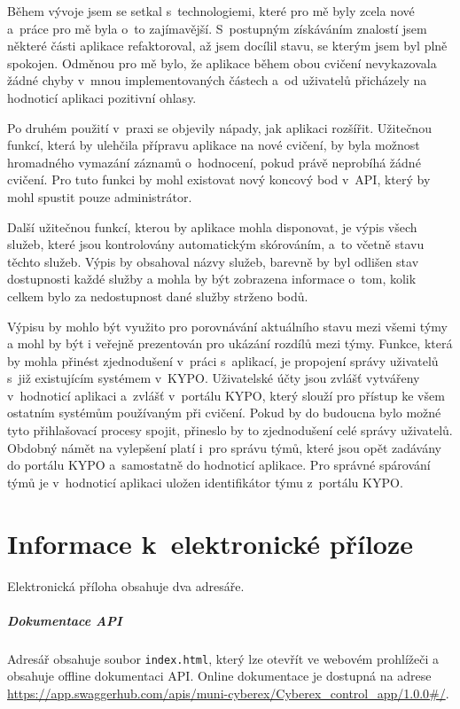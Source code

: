 \documentclass[
  digital,
  twoside,
  table, 
  nolof, 
  nolot
]{fithesis3}
\begin{document}
Během vývoje jsem se setkal s~technologiemi, které pro mě byly zcela nové a~práce pro mě byla o~to zajímavější. S~postupným získáváním znalostí jsem některé části aplikace refaktoroval, až jsem docílil stavu, se kterým jsem byl plně spokojen. Odměnou pro mě bylo, že aplikace během obou cvičení nevykazovala žádné chyby v~mnou implementovaných částech a~od uživatelů přicházely na hodnoticí aplikaci pozitivní ohlasy.

Po druhém použití v~praxi se objevily nápady, jak aplikaci rozšířit. Užitečnou funkcí, která by ulehčila přípravu aplikace na nové cvičení, by byla možnost hromadného vymazání záznamů o~hodnocení, pokud právě neprobíhá žádné cvičení. Pro tuto funkci by mohl existovat nový koncový bod v~API, který by mohl spustit pouze administrátor. 

Další užitečnou funkcí, kterou by aplikace mohla disponovat, je výpis všech služeb, které jsou kontrolovány automatickým skórováním, a~to včetně stavu těchto služeb. Výpis by obsahoval názvy služeb, barevně by byl odlišen stav dostupnosti každé služby a mohla by být zobrazena informace o~tom, kolik celkem bylo za nedostupnost dané služby strženo bodů.

Výpisu by mohlo být využito pro porovnávání aktuálního stavu mezi všemi týmy a mohl by být i veřejně prezentován pro ukázání rozdílů mezi týmy. Funkce, která by mohla přinést zjednodušení v~práci s~aplikací, je propojení správy uživatelů s~již existujícím systémem v~KYPO. Uživatelské účty jsou zvlášť vytvářeny v~hodnoticí aplikaci a~zvlášť v~portálu KYPO, který slouží pro přístup ke všem ostatním systémům používaným při cvičení. Pokud by do budoucna bylo možné tyto přihlašovací procesy spojit, přineslo by to zjednodušení celé správy uživatelů. Obdobný námět na vylepšení platí i~pro správu týmů, které jsou opět zadávány do portálu KYPO a~samostatně do hodnoticí aplikace. Pro správné spárování týmů je v~hodnoticí aplikaci uložen identifikátor týmu z~portálu KYPO.

\printbibliography[heading=bibintoc] %

\appendix %
\chapter{Informace k~elektronické příloze}

Elektronická příloha obsahuje dva adresáře.

\paragraph{Dokumentace API} Adresář obsahuje soubor \texttt{index.html}, který lze otevřít ve webovém prohlížeči a obsahuje offline dokumentaci API. Online dokumentace je dostupná na adrese \url{https://app.swaggerhub.com/apis/muni-cyberex/Cyberex_control_app/1.0.0#/}.
    
\end{document}
